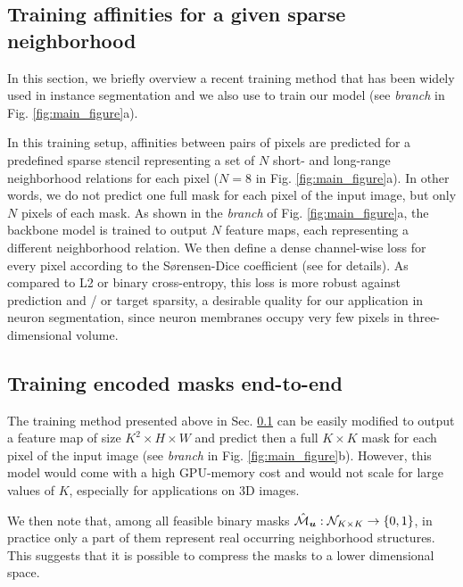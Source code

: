 \subsection{Training affinities for a given sparse neighborhood}\label{sec:affs_from_sparse}
In this section, we briefly overview a recent training method that has been widely used in instance segmentation \cite{liu2018affinity,Gao_2019_ICCV,lee2017superhuman,wolf2018mutex,bailoni2019generalized} and we also use to train our model (see \emph{\sparseBr branch} in Fig. \ref{fig:main_figure}a).

In this training setup, affinities between pairs of pixels are predicted for a predefined sparse stencil representing a set of $N$ short- and long-range neighborhood relations for each pixel ($N=8$ in Fig. \ref{fig:main_figure}a). In other words, we do not predict one full \maskname mask for each pixel of the input image, but only $N$ pixels of each \maskname mask. 
As shown in the \emph{\sparseBr branch} of Fig. \ref{fig:main_figure}a, the backbone model is trained to output $N$ feature maps, each representing a different neighborhood relation. We then define a dense channel-wise loss for every pixel according to the S\o rensen-Dice coefficient \cite{dice1945measures,sorensen1948method} (see \cite{wolf2018mutex} for details).
As compared to L2 or binary cross-entropy, this loss is more robust against prediction and / or target sparsity, a desirable quality for our application in neuron segmentation, since neuron membranes occupy very few pixels in three-dimensional volume.

\subsection{Training encoded \maskname masks end-to-end}\label{sec:encoding_masks}
The training method presented above in Sec. \ref{sec:affs_from_sparse} can be easily modified to output a feature map of size $K^2 \times H \times W$ and predict then a full $K\times K$ \maskname mask for each pixel of the input image (see \emph{\denseBr branch} in Fig. \ref{fig:main_figure}b).
However, this model would come with a high GPU-memory cost and would not scale for large values of $K$, especially for applications on 3D images.

We then note that, among all feasible binary masks $\hat{\mathcal{M}}_{\bm{u}}: \mathcal{N}_{K\times K} \rightarrow \{0,1\}$, in practice only a part of them represent real occurring neighborhood structures. 
This suggests that it is possible to compress the masks to a lower dimensional space. 

